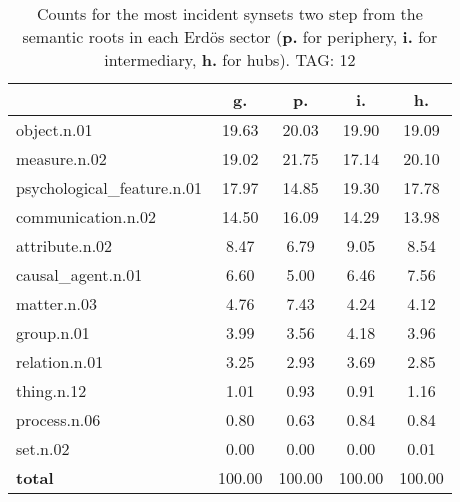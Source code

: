 \begin{table}[h!]
\begin{center}
\begin{tabular}{| l || c | c | c | c |}\hline
 & {\bf g.} & {\bf p.} & {\bf i.} & {\bf h.} \\\hline\hline
object.n.01 & 19.63  & 20.03  & 19.90  & 19.09 \\\hline
measure.n.02 & 19.02  & 21.75  & 17.14  & 20.10 \\\hline
psychological\_feature.n.01 & 17.97  & 14.85  & 19.30  & 17.78 \\\hline
communication.n.02 & 14.50  & 16.09  & 14.29  & 13.98 \\\hline
attribute.n.02 & 8.47  & 6.79  & 9.05  & 8.54 \\\hline
causal\_agent.n.01 & 6.60  & 5.00  & 6.46  & 7.56 \\\hline
matter.n.03 & 4.76  & 7.43  & 4.24  & 4.12 \\\hline
group.n.01 & 3.99  & 3.56  & 4.18  & 3.96 \\\hline
relation.n.01 & 3.25  & 2.93  & 3.69  & 2.85 \\\hline
thing.n.12 & 1.01  & 0.93  & 0.91  & 1.16 \\\hline
process.n.06 & 0.80  & 0.63  & 0.84  & 0.84 \\\hline
set.n.02 & 0.00  & 0.00  & 0.00  & 0.01 \\\hline\hline
{{\bf total}} & 100.00  & 100.00  & 100.00  & 100.00 \\\hline
\end{tabular}
\caption{Counts for the most incident synsets two step from the semantic roots in each Erd\"os sector ({\bf p.} for periphery, {\bf i.} for intermediary, {\bf h.} for hubs). TAG: 12}
\end{center}
\end{table}